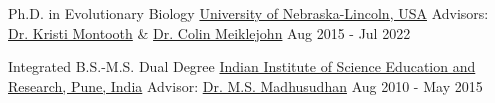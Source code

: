 

\begin{cventries}

  \eduentry
    {Ph.D. in Evolutionary Biology}  %
    {\href{https://biosci.unl.edu/}{University of Nebraska-Lincoln, USA}}  %
    {Advisors: \href{http://montoothlab.unl.edu/}{Dr. Kristi Montooth} \& \href{http://meiklejohnlab.unl.edu/}{Dr. Colin Meiklejohn}}  %
    {Aug 2015 - Jul 2022}  %

  \vspace{2.0mm} %

  \eduentry
    {Integrated B.S.-M.S. Dual Degree} %
    {\href{https://www.iiserpune.ac.in/}{Indian Institute of Science Education and Research, Pune, India}} %
    {Advisor: \href{http://cospi.iiserpune.ac.in/cospi/}{Dr. M.S. Madhusudhan}} %
    {Aug 2010 - May 2015} %

\end{cventries}
